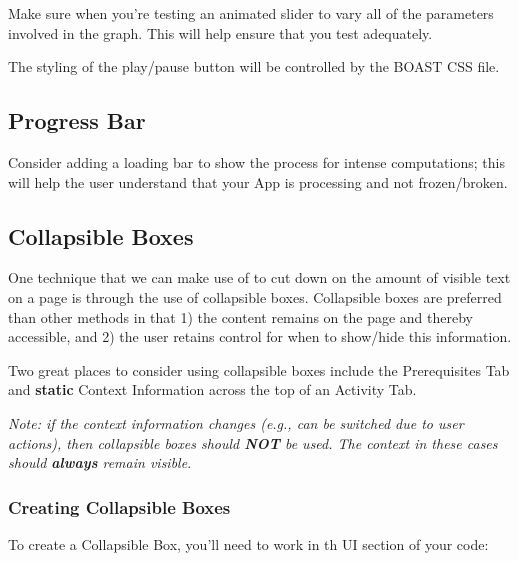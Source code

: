 \documentclass[
]{book}
\begin{document}
Make sure when you're testing an animated slider to vary all of the parameters involved in the graph. This will help ensure that you test adequately.

The styling of the play/pause button will be controlled by the BOAST CSS file.

\hypertarget{progress-bar}{%
\subsection{Progress Bar}\label{progress-bar}}

Consider adding a loading bar to show the process for intense computations; this will help the user understand that your App is processing and not frozen/broken.

\hypertarget{collapsible}{%
\subsection{Collapsible Boxes}\label{collapsible}}

One technique that we can make use of to cut down on the amount of visible text on a page is through the use of collapsible boxes. Collapsible boxes are preferred than other methods in that 1) the content remains on the page and thereby accessible, and 2) the user retains control for when to show/hide this information.

Two great places to consider using collapsible boxes include the Prerequisites Tab and \textbf{static} Context Information across the top of an Activity Tab.

\emph{Note: if the context information changes (e.g., can be switched due to user actions), then collapsible boxes should \textbf{NOT} be used. The context in these cases should \textbf{always} remain visible.}

\hypertarget{creating-collapsible-boxes}{%
\subsubsection{Creating Collapsible Boxes}\label{creating-collapsible-boxes}}

To create a Collapsible Box, you'll need to work in th UI section of your code:
\end{document}
